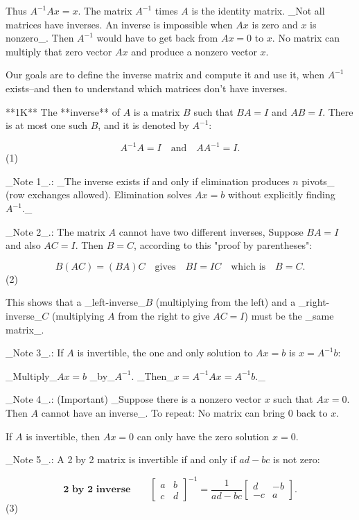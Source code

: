 Thus \(A^{-1}Ax=x\). The matrix \(A^{-1}\) times \(A\) is the identity matrix. _Not all matrices have inverses. An inverse is impossible when \(Ax\) is zero and \(x\) is nonzero_. Then \(A^{-1}\) would have to get back from \(Ax=0\) to \(x\). No matrix can multiply that zero vector \(Ax\) and produce a nonzero vector \(x\).

Our goals are to define the inverse matrix and compute it and use it, when \(A^{-1}\) exists--and then to understand which matrices don't have inverses.

**1K** The **inverse** of \(A\) is a matrix \(B\) such that \(BA=I\) and \(AB=I\). There is at most one such \(B\), and it is denoted by \(A^{-1}\):

\[A^{-1}A=I\quad\text{and}\quad AA^{-1}=I.\] (1)

_Note 1_.: _The inverse exists if and only if elimination produces \(n\) pivots_ (row exchanges allowed). Elimination solves \(Ax=b\) without explicitly finding \(A^{-1}\)._

_Note 2_.: The matrix \(A\) cannot have two different inverses, Suppose \(BA=I\) and also \(AC=I\). Then \(B=C\), according to this "proof by parentheses":

\[B(AC)=(BA)C\quad\text{gives}\quad BI=IC\quad\text{which is}\quad B=C.\] (2)

This shows that a _left-inverse_\(B\) (multiplying from the left) and a _right-inverse_\(C\) (multiplying \(A\) from the right to give \(AC=I\)) must be the _same matrix_.

_Note 3_.: If \(A\) is invertible, the one and only solution to \(Ax=b\) is \(x=A^{-1}b\):

_Multiply_\(Ax=b\) _by_\(A^{-1}\). _Then_\(x=A^{-1}Ax=A^{-1}b\)._

_Note 4_.: (Important) _Suppose there is a nonzero vector \(x\) such that \(Ax=0\). Then \(A\) cannot have an inverse_. To repeat: No matrix can bring \(0\) back to \(x\).

If \(A\) is invertible, then \(Ax=0\) can only have the zero solution \(x=0\).

_Note 5_.: A 2 by 2 matrix is invertible if and only if \(ad-bc\) is not zero:

\[\textbf{2 by 2 inverse}\qquad\begin{bmatrix}a&b\\ c&d\end{bmatrix}^{-1}=\frac{1}{ad-bc}\begin{bmatrix}d&-b\\ -c&a\end{bmatrix}.\] (3)

